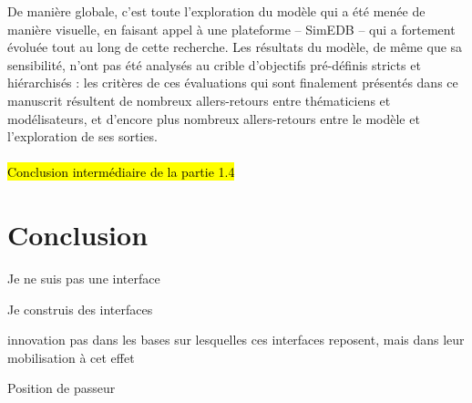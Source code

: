De manière globale, c'est toute l'exploration du modèle qui a été menée de manière visuelle, en faisant appel à une plateforme -- SimEDB -- qui a fortement évoluée tout au long de cette recherche.
Les \og résultats\fg{} du modèle, de même que sa sensibilité, n'ont pas été analysés au crible d'objectifs pré-définis stricts et hiérarchisés : les critères de ces évaluations qui sont finalement présentés dans ce manuscrit résultent de nombreux allers-retours entre thématiciens et modélisateurs, et d'encore plus nombreux allers-retours entre le modèle et l'exploration de ses sorties.

\bigskip
\paragraph[Conclusion intermédiaire]{}
\hl{Conclusion intermédiaire de la partie 1.4}

\section*{Conclusion}

\begin{compactitem}
	\item Je ne suis pas une interface
	\item Je construis des interfaces
	\item innovation pas dans les bases sur lesquelles ces interfaces reposent, mais dans leur mobilisation à cet effet
	\item Position de passeur
\end{compactitem}
	
